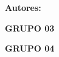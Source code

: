 \begin{center}
{\large \textbf{Autores:}}
\par
\vspace{12pt}

{\large \textbf {GRUPO 03}}
\par
\vspace{12pt}
{\normalsize \alunoA}
\par
{\normalsize \alunoB}
\par
{\normalsize \alunoC}
\par
{\normalsize \alunoD}
\par
{\normalsize \alunoE}
\par
{\normalsize \alunoF}
\par
\vspace{12pt}

{\large \textbf {GRUPO 04}}
\par
\vspace{12pt}
{\normalsize \alunoG}
\par
{\normalsize \alunoH}
\par

\end{center}
\clearpage



\renewcommand{\contentsname}{Conteúdo}
{
	\hypersetup{linkcolor=black}
	\tableofcontents
}
